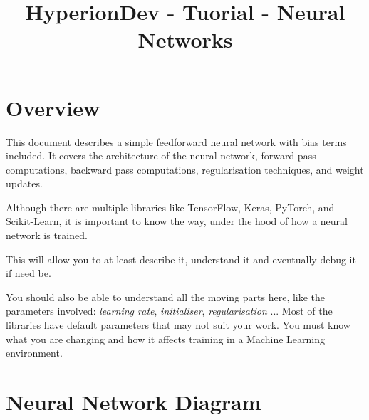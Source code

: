 \documentclass{article}
\title{HyperionDev - Tuorial - Neural Networks}
\begin{document}
	\maketitle
	
	\section*{Overview}
	
	This document describes a simple feedforward neural network with bias terms included. It covers the architecture of the neural network, forward pass computations, backward pass computations, regularisation techniques, and weight updates. 

Although there are multiple libraries like TensorFlow, Keras, PyTorch, and Scikit-Learn, it is important to know the way, under the hood of how a neural network is trained. 

This will allow you to at least describe it, understand it and eventually debug it if need be. 

You should also be able to understand all the moving parts here, like the parameters involved: \textit{learning rate}, \textit{initialiser}, \textit{regularisation} ... Most of the libraries have default parameters that may not suit your work. You must know what you are changing and how it affects training in a Machine Learning environment.
	
	\newpage
	
	\section*{Neural Network Diagram}
	
\end{document}
